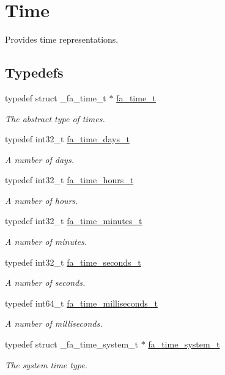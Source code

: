 \hypertarget{group___fa_time}{\section{Time}
\label{group___fa_time}
}


Provides time representations.  


\subsection*{Typedefs}
\begin{DoxyCompactItemize}
\item 
typedef struct \-\_\-fa\-\_\-time\-\_\-t $\ast$ \hyperlink{group___fa_time_ga227cc693f20b4873fed11028bcade184}{fa\-\_\-time\-\_\-t}
\begin{DoxyCompactList}\small\item\em The abstract type of times. \end{DoxyCompactList}\item 
typedef int32\-\_\-t \hyperlink{group___fa_time_ga126d90b34014d28bf3f4930b5e370598}{fa\-\_\-time\-\_\-days\-\_\-t}
\begin{DoxyCompactList}\small\item\em A number of days. \end{DoxyCompactList}\item 
typedef int32\-\_\-t \hyperlink{group___fa_time_gabb41271106b33206f546a0cb3b56a33e}{fa\-\_\-time\-\_\-hours\-\_\-t}
\begin{DoxyCompactList}\small\item\em A number of hours. \end{DoxyCompactList}\item 
typedef int32\-\_\-t \hyperlink{group___fa_time_ga1103d61f9fdf2839e8cc15ee5fac7b4e}{fa\-\_\-time\-\_\-minutes\-\_\-t}
\begin{DoxyCompactList}\small\item\em A number of minutes. \end{DoxyCompactList}\item 
typedef int32\-\_\-t \hyperlink{group___fa_time_gaa8f8fedfa6f26ed6ad00d134c2aeb6b8}{fa\-\_\-time\-\_\-seconds\-\_\-t}
\begin{DoxyCompactList}\small\item\em A number of seconds. \end{DoxyCompactList}\item 
typedef int64\-\_\-t \hyperlink{group___fa_time_gadebdebeab6c5ba7cd8002d0773635e61}{fa\-\_\-time\-\_\-milliseconds\-\_\-t}
\begin{DoxyCompactList}\small\item\em A number of milliseconds. \end{DoxyCompactList}\item 
typedef struct \-\_\-fa\-\_\-time\-\_\-system\-\_\-t $\ast$ \hyperlink{group___fa_time_ga7dd7e28574eec80380aac22be7087d2e}{fa\-\_\-time\-\_\-system\-\_\-t}
\begin{DoxyCompactList}\small\item\em The system time type. \end{DoxyCompactList}\end{DoxyCompactItemize}
